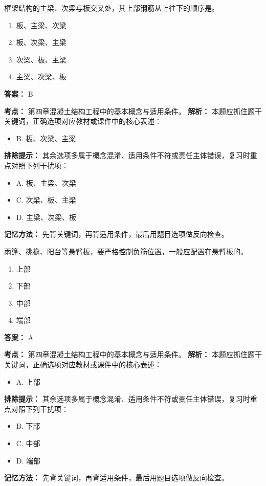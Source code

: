 \documentclass[UTF8,fontset=fandol,11pt]{ctexart}
\begin{document}
\vspace{0.2em}

\begin{quizbox}[title={第 26 题}]
框架结构的主梁、次梁与板交叉处，其上部钢筋从上往下的顺序是。\\
\begin{enumerate}[label=\Alph*.]
\item 板、主梁、次梁
\item 板、次梁、主梁
\item 次梁、板、主梁
\item 主梁、次梁、板
\end{enumerate}
\textbf{答案：} B
\vspace{0.25em}
\begin{answerbox}[title={考点解析}]
\textbf{考点：} 第四章混凝土结构工程中的基本概念与适用条件。
\textbf{解析：} 本题应抓住题干关键词，正确选项对应教材或课件中的核心表述：
\begin{itemize}
\item B. 板、次梁、主梁
\end{itemize}
\textbf{排除提示：} 其余选项多属于概念混淆、适用条件不符或责任主体错误，复习时重点对照下列干扰项：
\begin{itemize}
\item A. 板、主梁、次梁
\item C. 次梁、板、主梁
\item D. 主梁、次梁、板
\end{itemize}
\textbf{记忆方法：} 先背关键词，再背适用条件，最后用题目选项做反向检查。
\end{answerbox}
\end{quizbox}

\vspace{0.2em}

\begin{quizbox}[title={第 27 题}]
雨篷、挑檐、阳台等悬臂板，要严格控制负筋位置，一般应配置在悬臂板的。\\
\begin{enumerate}[label=\Alph*.]
\item 上部
\item 下部
\item 中部
\item 端部
\end{enumerate}
\textbf{答案：} A
\vspace{0.25em}
\begin{answerbox}[title={考点解析}]
\textbf{考点：} 第四章混凝土结构工程中的基本概念与适用条件。
\textbf{解析：} 本题应抓住题干关键词，正确选项对应教材或课件中的核心表述：
\begin{itemize}
\item A. 上部
\end{itemize}
\textbf{排除提示：} 其余选项多属于概念混淆、适用条件不符或责任主体错误，复习时重点对照下列干扰项：
\begin{itemize}
\item B. 下部
\item C. 中部
\item D. 端部
\end{itemize}
\textbf{记忆方法：} 先背关键词，再背适用条件，最后用题目选项做反向检查。
\end{answerbox}
\end{quizbox}
\end{document}

